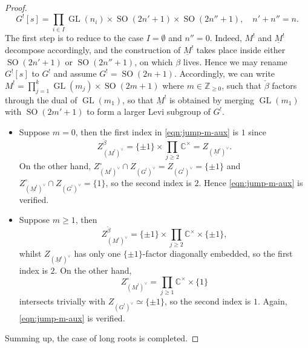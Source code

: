 \documentclass[11pt, a3paper, openany]{article}
\newcommand{\Z}{\ensuremath{\mathbb{Z}}}
\newcommand{\CC}{\ensuremath{\mathbb{C}}}
\newcommand{\GL}{\operatorname{GL}}
\newcommand{\SO}{\operatorname{SO}}
\theoremstyle{remark}
\theoremstyle{remark}
\theoremstyle{remark}
\newenvironment{Proof of claim}
  {\begin{proof}[\normalfont \textbf{Proof of claim}]}
  {\end{proof}}
\theoremstyle{definition}
\theoremstyle{remark}
\theoremstyle{plain}
\begin{document}
\begin{proof}
	\[ G^![s] = \prod_{i \in I} \GL(n_i) \times \SO(2n'+1) \times \SO(2n''+1), \quad n' + n'' = n. \]
	The first step is to reduce to the case $I = \emptyset$ and $n'' = 0$. Indeed, $M^!$ and $\underline{M}^!$ decompose accordingly, and the construction of $\underline{M}^!$ takes place inside either $\SO(2n'+1)$ or $\SO(2n''+1)$, on which $\beta$ lives. Hence we may rename $G^![s]$ to $G^!$ and assume $G^! = \SO(2n+1)$.
	Accordingly, we can write $M^! = \prod_{j=1}^k \GL(m_j) \times \SO(2m+1)$ where $m \in \Z_{\geq 0}$, such that $\check{\beta}$ factors through the dual of $\GL(m_1)$, so that $\underline{M}^!$ is obtained by merging $\GL(m_1)$ with $\SO(2m'+1)$ to form a larger Levi subgroup of $G^!$.
	\begin{itemize}
		\item Suppose $m=0$, then the first index in \eqref{eqn:jump-m-aux} is $1$ since
		\[ Z_{(M^!)^\vee}^{\check{\beta}} = \{\pm 1\} \times \prod_{j \geq 2} \CC^\times = Z_{(\underline{M}^!)^\vee}. \]
		On the other hand, $Z_{(M^!)^\vee}^\circ \cap Z_{(G^!)^\vee} = Z_{(G^!)^\vee} = \{\pm 1\}$ and $Z_{(\underline{M}^!)^\vee}^\circ \cap Z_{(G^!)^\vee} = \{1\}$, so the second index is $2$. Hence \eqref{eqn:jump-m-aux} is verified.
		\item Suppose $m \geq 1$, then
		\[ Z_{(M^!)^\vee}^{\check{\beta}} = \{\pm 1\} \times \prod_{j \geq 2} \CC^\times \times \{\pm 1\} ,\]
		whilst $Z_{(\underline{M}^!)^\vee}$ has only one $\{\pm 1\}$-factor diagonally embedded, so the first index is $2$. On the other hand,
		\[ Z_{(M^!)^\vee}^\circ = \prod_{j \geq 1} \CC^\times \times \{1\} \]
		intersects trivially with $Z_{(G^!)^\vee} \simeq \{\pm 1\}$, so the second index is $1$. Again, \eqref{eqn:jump-m-aux} is verified.
	\end{itemize}
	Summing up, the case of long roots is completed.
\end{proof}
\end{document}
